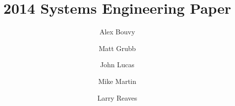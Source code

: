 \documentclass{article}
\begin{document}
\title{2014 Systems Engineering Paper}
\author{Alex Bouvy \and Matt Grubb \and John Lucas \and Mike Martin \and Larry Reaves}
\maketitle
\pagebreak
\tableofcontents
\pagebreak
\begin{multicols}{2}


\end{multicols}
\end{document}
